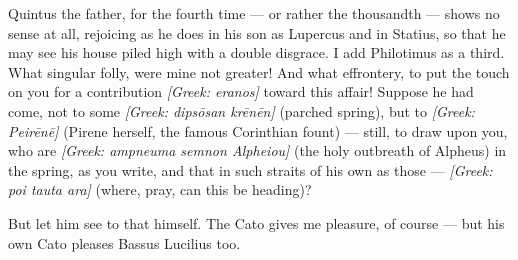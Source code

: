 

 Quintus the father, for the fourth time --- or rather the thousandth --- shows no sense at all, rejoicing as he does in his son as Lupercus and in Statius, so that he may see his house piled high with a double disgrace. I add Philotimus as a third. What singular folly, were mine not greater! And what effrontery, to put the touch on you for a contribution \textit{[Greek: eranos]} toward this affair! Suppose he had come, not to some \textit{[Greek: dips\=osan kr\=en\=en]} (parched spring), but to \textit{[Greek: Peir\=en\=e]} (Pirene herself, the famous Corinthian fount) --- still, to draw upon you, who are \textit{[Greek: ampneuma semnon Alpheiou]} (the holy outbreath of Alpheus) in the spring, as you write, and that in such straits of his own as those --- \textit{[Greek: poi tauta ara]} (where, pray, can this be heading)?

 But let him see to that himself. The Cato gives me pleasure, of course --- but his own Cato pleases Bassus Lucilius too.
